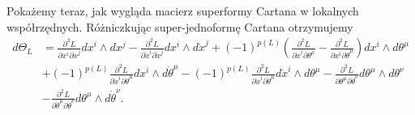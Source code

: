 \documentclass[11pt,a4paper]{report}
\theoremstyle{definition}
\begin{document}
Pokażemy teraz, jak wygląda macierz superformy Cartana w lokalnych współrzędnych. Różniczkując super-jednoformę Cartana otrzymujemy
\begin{equation*}
	\begin{aligned}
		d\Theta_L & =                                                                                                              
		\frac{\partial^2 L}{\partial x^i \partial \dot x^j} dx^i \wedge dx^j
		- \frac{\partial^2 L}{\partial \dot x^i \partial \dot x^j} dx^i \wedge d\dot x^j
		+ (-1)^{p(L)} \left( \frac{\partial^2 L}{\partial \dot x^i \partial \theta^\mu} - \frac{\partial^2 L}{\partial x^i \partial \dot \theta^\mu} \right) dx^i \wedge d\theta^\mu \\
		          & + (-1)^{p(L)} \frac{\partial^2 L}{\partial \dot x^i \partial \dot \theta^\mu} dx^i \wedge d\dot \theta^\mu     
		- (-1)^{p(L)} \frac{\partial^2 L}{\partial \dot x^i \partial \dot \theta^\mu} d\dot x^i \wedge d\theta^\mu 
		- \frac{\partial^2 L}{\partial \theta^\mu \partial \dot \theta^\nu} d\theta^\mu \wedge d\theta^\nu \\
		          & - \frac{\partial^2 L}{\partial \dot \theta^\mu \partial \dot \theta^\nu} d\theta^\mu \wedge d \dot \theta^\nu. 
	\end{aligned}
\end{equation*}
			      				
\end{document}
